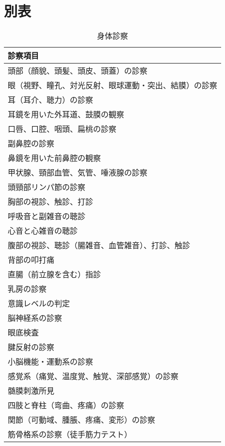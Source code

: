 \hypertarget{ux5225ux8868}{%
\section{別表}\label{ux5225ux8868}}

\begin{xltabular}{\linewidth}{X}
\caption{\label{tbl:身体診察}身体診察} \\
\toprule
診察項目 \\
\midrule
\endhead
頭部（顔貌、頭髪、頭皮、頭蓋）の診察 \\
眼（視野、瞳孔、対光反射、眼球運動・突出、結膜）の診察 \\
耳（耳介、聴力）の診察 \\
耳鏡を用いた外耳道、鼓膜の観察 \\
口唇、口腔、咽頭、扁桃の診察 \\
副鼻腔の診察 \\
鼻鏡を用いた前鼻腔の観察 \\
甲状腺、頸部血管、気管、唾液腺の診察 \\
頭頸部リンパ節の診察 \\
胸部の視診、触診、打診 \\
呼吸音と副雑音の聴診 \\
心音と心雑音の聴診 \\
腹部の視診、聴診（腸雑音、血管雑音）、打診、触診 \\
背部の叩打痛 \\
直腸（前立腺を含む）指診 \\
乳房の診察 \\
意識レベルの判定 \\
脳神経系の診察 \\
眼底検査 \\
腱反射の診察 \\
小脳機能・運動系の診察 \\
感覚系（痛覚、温度覚、触覚、深部感覚）の診察 \\
髄膜刺激所見 \\
四肢と脊柱（弯曲、疼痛）の診察 \\
関節（可動域、腫脹、疼痛、変形）の診察 \\
筋骨格系の診察（徒手筋力テスト） \\
\bottomrule
\end{xltabular}

